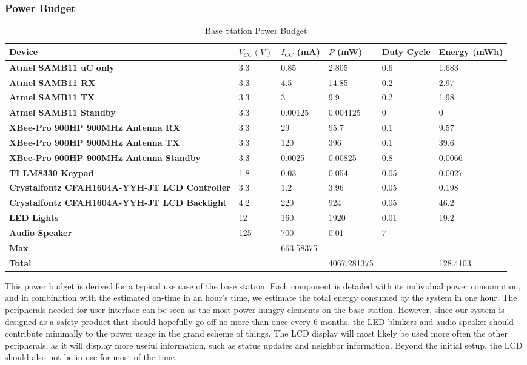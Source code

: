 \documentclass[journal,compsoc]{IEEEtran}
\begin{document}
\subsubsection{Power Budget}

\begin{table*}[t]
  \centering
  \begin{tabular}{>{\bfseries}l|l l l l l}
    Device & $V_{CC} (V)$ & $I_{CC}$ (mA) & $P$ (mW) & Duty Cycle & Energy (mWh) \\
    \hline
    Atmel SAMB11 uC only & 3.3 & 0.85 & 2.805 & 0.6 & 1.683 \\
    Atmel SAMB11 RX & 3.3 & 4.5 & 14.85 & 0.2 & 2.97 \\
    Atmel SAMB11 TX & 3.3 & 3 & 9.9 & 0.2 & 1.98 \\
    Atmel SAMB11 Standby & 3.3 & 0.00125 & 0.004125 & 0 & 0 \\
    XBee-Pro 900HP 900MHz Antenna RX & 3.3 & 29 & 95.7 & 0.1 & 9.57 \\
    XBee-Pro 900HP 900MHz Antenna TX & 3.3 & 120 & 396 & 0.1 & 39.6 \\
    XBee-Pro 900HP 900MHz Antenna Standby & 3.3 & 0.0025 & 0.00825 & 0.8 & 0.0066 \\
    TI LM8330 Keypad & 1.8 & 0.03 & 0.054 & 0.05 & 0.0027 \\
    Crystalfontz CFAH1604A-YYH-JT LCD Controller & 3.3 & 1.2 & 3.96 & 0.05 & 0.198 \\
    Crystalfontz CFAH1604A-YYH-JT LCD Backlight & 4.2 & 220 & 924 & 0.05 & 46.2 \\
    LED Lights & 12 & 160 & 1920 & 0.01 & 19.2 \\
    Audio Speaker & 125 & 700 & 0.01 & 7 \\
    \hline
    Max & & 663.58375 & & & \\
    Total & & & 4067.281375 & & 128.4103
  \end{tabular}
  \caption{Base Station Power Budget}
\end{table*}

This power budget is derived for a typical use case of the base station.  Each component is detailed with its individual power consumption, and in combination with the estimated on-time in an hour’s time, we estimate the total energy consumed by the system in one hour.  The peripherals needed for user interface can be seen as the most power hungry elements on the base station.  However, since our system is designed as a safety product that should hopefully go off no more than once every 6 months, the LED blinkers and audio speaker should contribute minimally to the power usage in the grand scheme of things.  The LCD display will most likely be used more often the other peripherals, as it will display more useful information, such as status updates and neighbor information.  Beyond the initial setup, the LCD should also not be in use for most of the time.\\
\end{document}
